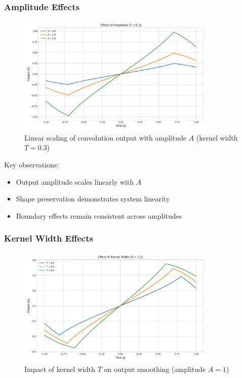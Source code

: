 \subsubsection{Amplitude Effects}
\begin{figure}[H]
    \centering
    \includegraphics[width=0.85\textwidth]{codes/codes_sin_1_and_arcsin/figures/amplitude_effect.png}
    \caption{Linear scaling of convolution output with amplitude $A$ (kernel width $T=0.3$)}
    \label{fig:amplitude}
\end{figure}

Key observations:
\begin{itemize}
\item Output amplitude scales linearly with $A$
\item Shape preservation demonstrates system linearity
\item Boundary effects remain consistent across amplitudes
\end{itemize}

\subsubsection{Kernel Width Effects}
\begin{figure}[H]
    \centering
    \includegraphics[width=0.85\textwidth]{codes/codes_sin_1_and_arcsin/figures/kernel_width_effect.png}
    \caption{Impact of kernel width $T$ on output smoothing (amplitude $A=1$)}
    \label{fig:kernel}
\end{figure}

